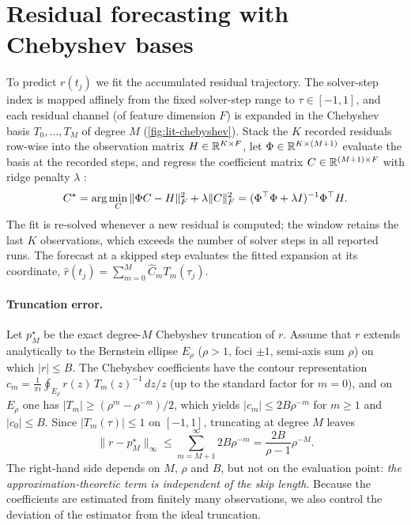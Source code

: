 \section{Residual forecasting with Chebyshev bases}\label{sec:respect-cheb}

To predict $r(t_j)$ we fit the accumulated residual trajectory. The solver-step index is mapped affinely from the fixed solver-step range to $\tau\in[-1,1]$, and each residual channel (of feature dimension $F$) is expanded in the Chebyshev basis $T_0,\dots,T_M$ of degree $M$ (\cref{fig:lit-chebyshev}). Stack the $K$ recorded residuals row-wise into the observation matrix $H\in\mathbb{R}^{K\times F}$, let $\Phi\in\mathbb{R}^{K\times(M+1)}$ evaluate the basis at the recorded steps, and regress the coefficient matrix $C\in\mathbb{R}^{(M+1)\times F}$ with ridge penalty $\lambda$ \citep{hoerl1970ridge}:
\begin{equation}\label{eq:respect-ridge}
  C^\star = \arg\min_C \|\Phi C - H\|_F^2 + \lambda\|C\|_F^2 = (\Phi^{\top}\Phi+\lambda I)^{-1}\Phi^{\top} H .
\end{equation}
The fit is re-solved whenever a new residual is computed; the window retains the last $K$ observations, which exceeds the number of solver steps in all reported runs. The forecast at a skipped step evaluates the fitted expansion at its coordinate, $\hat r(t_j)=\sum_{m=0}^M \hat C_m T_m(\tau_j)$.

\paragraph{Truncation error.} Let $p^\star_M$ be the exact degree-$M$ Chebyshev truncation of $r$. Assume that $r$ extends analytically to the Bernstein ellipse $E_\rho$ ($\rho>1$, foci $\pm1$, semi-axis sum $\rho$) on which $|r|\le B$. The Chebyshev coefficients have the contour representation $c_m = \frac{1}{\pi i}\oint_{E_\rho} r(z)\,T_m(z)^{-1}\,dz/z$ (up to the standard factor for $m=0$), and on $E_\rho$ one has $|T_m|\ge(\rho^m-\rho^{-m})/2$, which yields $|c_m|\le 2B\rho^{-m}$ for $m\ge1$ and $|c_0|\le B$. Since $|T_m(\tau)|\le 1$ on $[-1,1]$, truncating at degree $M$ leaves \citep[Thm.~3.2]{han2026spectrum}
\begin{equation}\label{eq:respect-trunc}
  \|r-p^\star_M\|_\infty \le \sum_{m=M+1}^{\infty}2B\rho^{-m} = \frac{2B}{\rho-1}\rho^{-M}.
\end{equation}
The right-hand side depends on $M$, $\rho$ and $B$, but not on the evaluation point: \emph{the approximation-theoretic term is independent of the skip length}. Because the coefficients are estimated from finitely many observations, we also control the deviation of the estimator from the ideal truncation.

